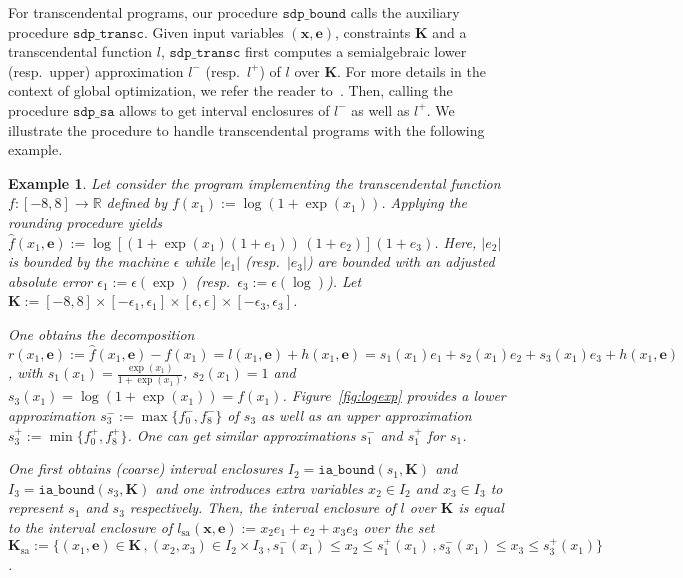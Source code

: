 \documentclass[preprint]{sigplanconf}
\newcommand{\R}{\mathbb{R}}
\newcommand{\x}{\mathbf{x}}
\newcommand{\e}{\mathbf{e}}
\def\K{\mathbf{K}}
\newcommand{\iaboundfun}[2]{\mathtt{ia\_bound}(#1, #2)}
\newcommand{\sdpbound}{\mathtt{sdp\_bound}}
\newcommand{\sa}{_\text{sa}}
\newcommand{\sdpsa}{\mathtt{sdp\_sa}}
\newcommand{\sdptransc}{\mathtt{sdp\_transc}}
\theoremstyle{plain}
\newtheorem{example}{Example}
\begin{document}
For transcendental programs, our procedure $\sdpbound$ calls the auxiliary procedure $\sdptransc$. Given input variables $(\x,\e)$, constraints $\K$ and a transcendental function $l$, $\sdptransc$ first computes a semialgebraic lower (resp.~upper)  approximation $l^-$ (resp.~$l^+$) of $l$ over $\K$. For more details in the context of global optimization, we refer the reader to~\cite{Magron15sdp}. Then, calling the procedure $\sdpsa$ allows to get interval enclosures of $l^-$ as well as $l^+$.
We illustrate the procedure to handle transcendental programs with the following example.
\begin{example}
\label{ex:logexp}
Let consider the program implementing the transcendental function $f : [-8, 8] \to \R$ defined by $f(x_1) := \log (1 + \exp(x_1))$. Applying the rounding procedure  yields $\hat{f}(x_1,\e) := \log [(1 + \exp(x_1) (1 + e_1)) \, (1 + e_2)](1 + e_3)$. 
Here, $|e_2|$ is bounded by the machine $\epsilon$ while $|e_1|$ (resp.~$|e_3|$) are bounded with an adjusted absolute error $\epsilon_1 := \epsilon(\exp)$ (resp.~$\epsilon_3 := \epsilon(\log)$).
Let $\K:= [-8,8] \times [-\epsilon_1, \epsilon_1] \times [\epsilon, \epsilon] \times [-\epsilon_3, \epsilon_3]$.

One obtains the decomposition $r(x_1, \e) := \hat{f}(x_1,\e) - f(x_1) = l(x_1,\e) + h(x_1,\e) = s_1 (x_1) e_1 + s_2 (x_1) e_2 + s_3 (x_1) e_3 + h(x_1, \e)$, with 
$s_1(x_1) = \frac{\exp(x_1)} {1 + \exp(x_1)}$, $s_2(x_1) = 1$ and $s_3(x_1) = \log (1 + \exp(x_1)) = f(x_1)$. Figure~\ref{fig:logexp} provides a lower approximation $s_3^- := \max\{f_0^-,f_8^-\}$ of $s_3$ as well as an upper approximation $s_3^+ := \min \{f_0^+,f_8^+\}$. One can get similar approximations $s_1^-$ and $s_1^+$ for $s_1$. 

One first obtains (coarse) interval enclosures $I_2 = \iaboundfun{s_1}{\K}$ and $I_3 = \iaboundfun{s_3}{\K}$ and one introduces extra variables $x_2 \in I_2$ and $x_3 \in I_3$ to represent $s_1$ and $s_3$ respectively.
Then, the interval enclosure of $l$ over $\K$ is equal to the interval enclosure of $l\sa(\x,\e) := x_2 e_1 + e_2 + x_3 e_3$ over the set $\K\sa:= \{(x_1,\e) \in \K \,, (x_2, x_3) \in I_2 \times I_3 \,, s_1^-(x_1) \leq x_2 \leq s_1^+(x_1) \,, s_3^-(x_1) \leq x_3 \leq s_3^+(x_1) \}$.
\end{example}
%
\end{document}
